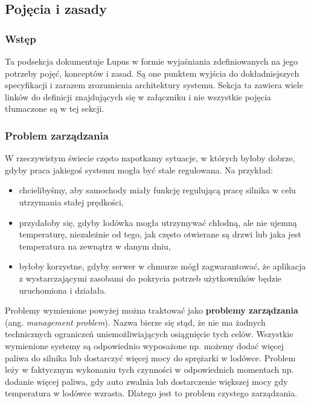 \subsection{Pojęcia i zasady}

\subsubsection{Wstęp}
Ta podsekcja dokumentuje Lupus w formie wyjaśniania zdefiniowanych na jego potrzeby pojęć, konceptów i zasad. Są one punktem wyjścia do dokładniejszych specyfikacji i zarazem zrozumienia architektury systemu. Sekcja ta zawiera wiele linków do definicji znajdujących się w załączniku i nie wszystkie pojęcia tłumaczone są w tej sekcji.

\subsubsection{Problem zarządzania}

W rzeczywistym świecie często napotkamy sytuacje, w których byłoby dobrze, gdyby praca jakiegoś systemu mogła być stale regulowana. Na przykład:

\begin{itemize}
    \item chcielibyśmy, aby samochody miały funkcję regulującą pracę silnika w celu utrzymania stałej prędkości,
    \item przydałoby się, gdyby lodówka mogła utrzymywać chłodną, ale nie ujemną temperaturę, niezależnie od tego, jak często otwierane są drzwi lub jaka jest temperatura na zewnątrz w danym dniu,
    \item byłoby korzystne, gdyby serwer w chmurze mógł zagwarantować, że aplikacja z wystarczającymi zasobami do pokrycia potrzeb użytkowników będzie uruchomiona i działała.
\end{itemize}

Problemy wymienione powyżej można traktować jako \textbf{problemy zarządzania} (ang. \textit{management problem}). Nazwa bierze się stąd, że nie ma żadnych technicznych ograniczeń uniemożliwiających osiągnięcie tych celów. Wszystkie wymienione systemy są odpowiednio wyposażone np. możemy dodać więcej paliwa do silnika lub dostarczyć więcej mocy do sprężarki w lodówce. Problem leży w faktycznym wykonaniu tych czynności w odpowiednich momentach np. dodanie więcej paliwa, gdy auto zwalnia lub dostarczenie większej mocy gdy temperatura w lodówce wzrasta. Dlatego jest to problem czystego zarządzania.

